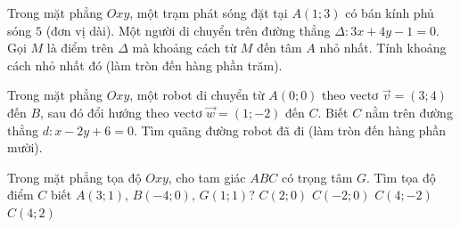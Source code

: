 \begin{bt}%
Trong mặt phẳng $Oxy$, một trạm phát sóng đặt tại $A(1;3)$ có bán kính phủ sóng $5$ (đơn vị dài). Một người di chuyển trên đường thẳng $\Delta\colon 3x+4y-1=0$. Gọi $M$ là điểm trên $\Delta$ mà khoảng cách từ $M$ đến tâm $A$ nhỏ nhất. Tính khoảng cách nhỏ nhất đó (làm tròn đến hàng phần trăm).

\end{bt}

\begin{bt}%
Trong mặt phẳng $Oxy$, một robot di chuyển từ $A(0;0)$ theo vectơ $\overrightarrow{v}=(3;4)$ đến $B$, sau đó đổi hướng theo vectơ $\overrightarrow{w}=(1;-2)$ đến $C$. Biết $C$ nằm trên đường thẳng $d\colon x-2y+6=0$. Tìm quãng đường robot đã đi (làm tròn đến hàng phần mười).

\end{bt}

\begin{ex}%
	Trong mặt phẳng tọa độ $Oxy$, cho tam  giác $ABC$ có trọng tâm $G$. Tìm tọa độ điểm $C$ biết $A(3;1)$, $B(-4;0)$, $G(1;1)$?
	 \choice
		{$C(2;0)$} 
		 {$C(-2;0)$}
		 {$C(4;-2)$}
		{\True  $C(4;2)$}
\end{ex}

